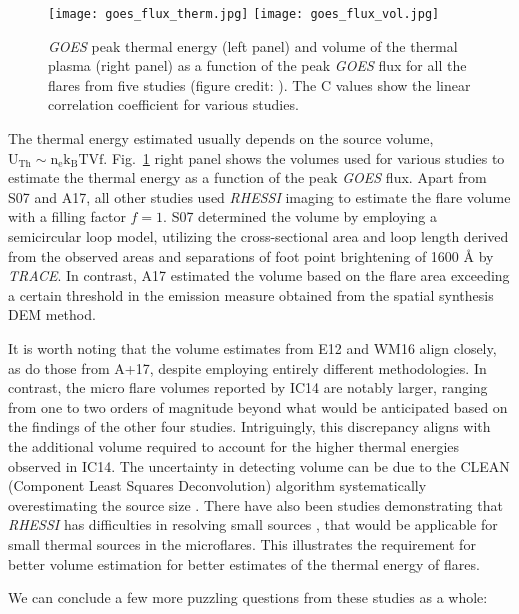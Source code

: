 \begin{figure}[ht!]
    \centering
    \texttt{[image: goes\_flux\_therm.jpg]}
    \texttt{[image: goes\_flux\_vol.jpg]}
    \caption[Correlation of peak {\it GOES} flux with peak thermal energy and flaring plasma volume.]{{\it GOES} peak thermal energy (left panel) and volume of the thermal plasma (right panel) as a function of the peak {\it GOES} flux for all the flares from five studies (figure credit: \cite{warmuth20}). The C values show the linear correlation coefficient for various studies.}
    \label{fig:goes-therm}
\end{figure}

The thermal energy estimated usually depends on the source volume, $\mathrm{U_{Th}\sim n_{e}k_{B}TVf}$. Fig.~\ref{fig:goes-therm} right panel shows the volumes used for various studies to estimate the thermal energy as a function of the peak {\it GOES} flux. Apart from S07 and A17, all other studies used {\it RHESSI} imaging to estimate the flare volume with a filling factor $f=1$. S07 determined the volume by employing a semicircular loop model, utilizing the cross-sectional area and loop length derived from the observed areas and separations of foot point brightening of 1600  {\AA} by {\it TRACE}. In contrast, A17 estimated the volume based on the flare area exceeding a certain threshold in the emission measure obtained from the spatial synthesis DEM method. 

It is worth noting that the volume estimates from E12 and WM16 align closely, as do those from A+17, despite employing entirely different methodologies. In contrast, the micro flare volumes reported by IC14 are notably larger, ranging from one to two orders of magnitude beyond what would be anticipated based on the findings of the other four studies. Intriguingly, this discrepancy aligns with the additional volume required to account for the higher thermal energies observed in IC14. The uncertainty in detecting volume can be due to the CLEAN (Component Least Squares Deconvolution) algorithm systematically overestimating the source size \citep{warmuth13a}. There have also been studies demonstrating that {\it RHESSI} has difficulties in resolving small sources \citep{dennis09,warmuth13b}, that would be applicable for small thermal sources in the microflares. This illustrates the requirement for better volume estimation for better estimates of the thermal energy of flares.

We can conclude a few more puzzling questions from these studies as a whole: %


